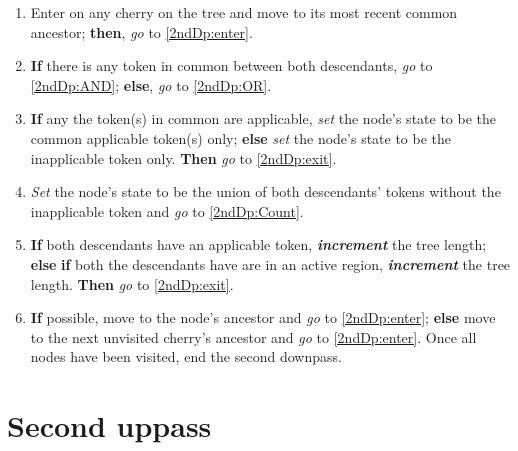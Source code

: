 \documentclass[a4paper,12pt]{article}
\begin{document}
\begin{enumerate}
    \item  Enter on any cherry on the tree and move to its most recent common ancestor; \textbf{then}, \textit{go} to \ref{2ndDp:enter}.



    \item \label{2ndDp:enter} \textbf{If} there is any token in common between both descendants, \textit{go} to \ref{2ndDp:AND}; \textbf{else}, \textit{go} to \ref{2ndDp:OR}.
    \item \label{2ndDp:AND} \textbf{If} any the token(s) in common are applicable, \textit{set} the node's state to be the common applicable token(s) only; \textbf{else} \textit{set} the node's state to be the inapplicable token only. \textbf{Then} \textit{go} to \ref{2ndDp:exit}. 
    \item \label{2ndDp:OR} \textit{Set} the node's state to be the union of both descendants' tokens without the inapplicable token and \textit{go} to \ref{2ndDp:Count}.
    \item \label{2ndDp:Count}  \textbf{If} both descendants have an applicable token, \textbf{\textit{increment}} the tree length; \textbf{else} \textbf{if} both the descendants have are in an active region, \textbf{\textit{increment}} the tree length. \textbf{Then} \textit{go} to \ref{2ndDp:exit}. %
    \item \label{2ndDp:exit} \textbf{If} possible, move to the node's ancestor and \textit{go} to \ref{2ndDp:enter}; \textbf{else} move to the next unvisited cherry's ancestor and \textit{go} to \ref{2ndDp:enter}. Once all nodes have been visited, end the second downpass.
\end{enumerate}

\section{Second uppass} \label{2ndUp}
\end{document}
